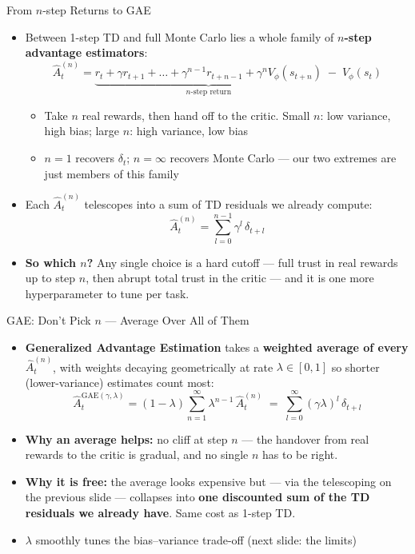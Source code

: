 \begin{frame}{From $n$-step Returns to GAE}
\vspace{-2mm}
\begin{itemize}
    \item Between 1-step TD and full Monte Carlo lies a whole family of \textbf{$n$-step advantage estimators}:
    $$\hat{A}^{(n)}_t = \underbrace{r_t + \gamma r_{t+1} + \dots + \gamma^{n-1} r_{t+n-1} + \gamma^{n} V_\phi(s_{t+n})}_{n\text{-step return}} \;-\; V_\phi(s_t)$$
    \begin{itemize}
        \item Take $n$ real rewards, then hand off to the critic. Small $n$: low variance, high bias; large $n$: high variance, low bias
        \item $n=1$ recovers $\delta_t$; $n=\infty$ recovers Monte Carlo --- our two extremes are just members of this family
    \end{itemize}
    \pause
    \item Each $\hat{A}^{(n)}_t$ telescopes into a sum of TD residuals we already compute:
    $$\hat{A}^{(n)}_t = \sum_{l=0}^{n-1} \gamma^{l}\, \delta_{t+l}$$
    \item \textbf{So which $n$?} Any single choice is a hard cutoff --- full trust in real rewards up to step $n$, then abrupt total trust in the critic --- and it is one more hyperparameter to tune per task.
\end{itemize}
\end{frame}

\begin{frame}{GAE: Don't Pick $n$ --- Average Over All of Them}
\begin{itemize}
    \item \textbf{Generalized Advantage Estimation} takes a \textbf{weighted average of every $\hat{A}^{(n)}_t$}, with weights decaying geometrically at rate $\lambda \in [0,1]$ so shorter (lower-variance) estimates count most:
    $$\hat{A}^{\mathrm{GAE}(\gamma,\lambda)}_t = (1-\lambda)\sum_{n=1}^{\infty} \lambda^{n-1}\, \hat{A}^{(n)}_t \;=\; \sum_{l=0}^{\infty} (\gamma\lambda)^l\, \delta_{t+l}$$
    \pause
    \item \textbf{Why an average helps:} no cliff at step $n$ --- the handover from real rewards to the critic is gradual, and no single $n$ has to be right.
    \item \textbf{Why it is free:} the average looks expensive but --- via the telescoping on the previous slide --- collapses into \textbf{one discounted sum of the TD residuals we already have}. Same cost as 1-step TD.
    \item $\lambda$ smoothly tunes the bias--variance trade-off (next slide: the limits)
\end{itemize}
\end{frame}
